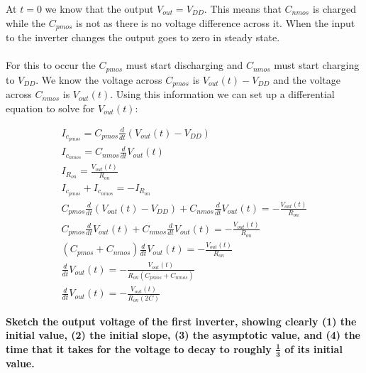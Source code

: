 \begin{enumerate}
{  At $t = 0$ we know that the output $V_{out} = V_{DD}$.
  This means that $C_{nmos}$ is charged while the $C_{pmos}$ is not as there is no voltage difference across it.
  When the input to the inverter changes the output goes to zero in steady state.
  \\
  \\
  For this to occur the $C_{pmos}$ must start discharging and $C_{nmos}$ must start charging to $V_{DD}$.
  We know the voltage across $C_{pmos}$ is $V_{out}(t) - V_{DD}$ and the voltage across $C_{nmos}$ is $V_{out}(t)$.
  Using this information we can set up a differential equation to solve for $V_{out}(t)$:

\begin{align*}
  I_{c_{pmos}} = C_{pmos} \frac{d}{dt}(V_{out}(t) - V_{DD}) \\
  I_{c_{nmos}} = C_{nmos} \frac{d}{dt}V_{out}(t) \\
  I_{R_{on}} = \frac{V_{out}(t)}{R_{on}} \\
  I_{c_{pmos}} + I_{c_{nmos}} = -I_{R_{on}} \\
  C_{pmos} \frac {d}{dt} (V_{out}(t) - V_{DD}) + C_{nmos} \frac {d}{dt} V_{out}(t) = - \frac {V_{out}(t)}{R_{on}} \\
  C_{pmos} \frac {d}{dt} V_{out}(t) + C_{nmos} \frac{d}{dt} V_{out}(t) = - \frac {V_{out} (t)} {R_{on}} \\
  (C_{pmos} + C_{nmos}) \frac {d}{dt} V_{out} (t) = - \frac {V_{out}(t)} {R_{on}} \\
  \frac {d}{dt} V_{out}(t) = - \frac {V_{out} (t)} {R_{on} (C_{pmos} + C_{nmos})} \\
  \frac {d}{dt} V_{out} (t) = - \frac {V_{out} (t)} {R_{on} (2C)}
\end{align*}
}


\qitem \textbf{Sketch the output voltage of the first inverter, showing clearly (1) the initial value, (2) the initial slope, (3) the asymptotic value, and (4) the time that it takes for the voltage to decay to roughly $\mathbf{\frac{1}{3}}$ of its initial value.}

\end{enumerate}
